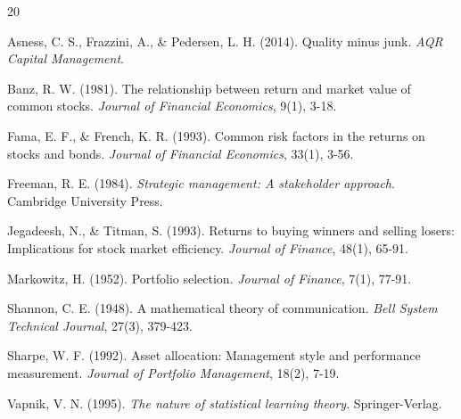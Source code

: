\documentclass[12pt,a4paper]{article}
\begin{document}
\begin{thebibliography}{20}

Asness, C. S., Frazzini, A., \& Pedersen, L. H. (2014). Quality minus junk. \textit{AQR Capital Management}.

Banz, R. W. (1981). The relationship between return and market value of common stocks. \textit{Journal of Financial Economics}, 9(1), 3-18.

Fama, E. F., \& French, K. R. (1993). Common risk factors in the returns on stocks and bonds. \textit{Journal of Financial Economics}, 33(1), 3-56.

Freeman, R. E. (1984). \textit{Strategic management: A stakeholder approach}. Cambridge University Press.

Jegadeesh, N., \& Titman, S. (1993). Returns to buying winners and selling losers: Implications for stock market efficiency. \textit{Journal of Finance}, 48(1), 65-91.

Markowitz, H. (1952). Portfolio selection. \textit{Journal of Finance}, 7(1), 77-91.

Shannon, C. E. (1948). A mathematical theory of communication. \textit{Bell System Technical Journal}, 27(3), 379-423.

Sharpe, W. F. (1992). Asset allocation: Management style and performance measurement. \textit{Journal of Portfolio Management}, 18(2), 7-19.

Vapnik, V. N. (1995). \textit{The nature of statistical learning theory}. Springer-Verlag.

\end{thebibliography}
\end{document}
